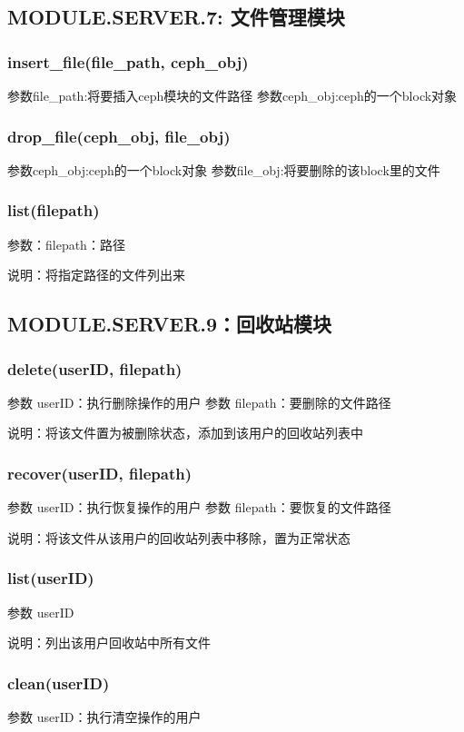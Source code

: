 \subsection{MODULE.SERVER.7: 文件管理模块}

\subsubsection{insert\_file(file\_path, ceph\_obj)}
参数file\_path:将要插入ceph模块的文件路径
参数ceph\_obj:ceph的一个block对象

\subsubsection{drop\_file(ceph\_obj, file\_obj)}
参数ceph\_obj:ceph的一个block对象
参数file\_obj:将要删除的该block里的文件

\subsubsection{list(filepath)}
参数：filepath：路径

说明：将指定路径的文件列出来


\subsection{MODULE.SERVER.9：回收站模块}

\subsubsection{delete(userID, filepath)}
参数 userID：执行删除操作的用户
参数 filepath：要删除的文件路径

说明：将该文件置为被删除状态，添加到该用户的回收站列表中

\subsubsection{recover(userID, filepath)}
参数 userID：执行恢复操作的用户
参数 filepath：要恢复的文件路径

说明：将该文件从该用户的回收站列表中移除，置为正常状态

\subsubsection{list(userID)}
参数 userID

说明：列出该用户回收站中所有文件

\subsubsection{clean(userID)}
参数 userID：执行清空操作的用户

